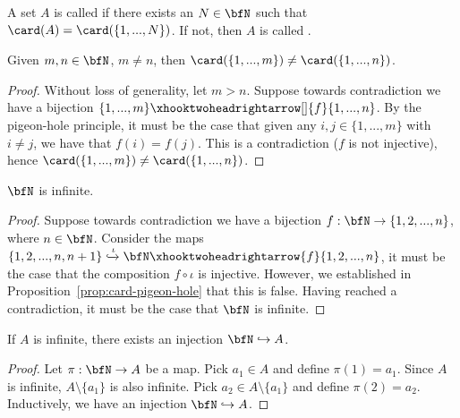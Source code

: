         \begin{definition}
            A set $A$ is called  if there exists an $N \in \bfN$ such that $\card(A) = \card(\{1,...,N\})$. If not, then $A$ is called .
        \end{definition}

        \begin{proposition}\label{prop:card-pigeon-hole}
            Given $m,n \in \bfN$, $m \neq n$, then $\card(\{1,...,m\}) \neq \card(\{1,...,n\})$.
        \end{proposition}
            \begin{proof}
                Without loss of generality, let $m > n$. Suppose towards contradiction we have a bijection $\{1,...,m\} \xhooktwoheadrightarrow[]{f} \{1,...,n\}$. By the pigeon-hole principle, it must be the case that \textemdash given any $i,j \in \{1,...,m\}$ with $i\neq j$, we have that $f(i) = f(j)$. This is a contradiction ($f$ is not injective), hence $\card(\{1,...,m\}) \neq \card(\{1,...,n\})$.
            \end{proof}

        \begin{proposition}
            $\bfN$ is infinite.
        \end{proposition}
            \begin{proof}
                Suppose towards contradiction we have a bijection $f:\bfN \rightarrow \{1,2,...,n\}$, where $n \in \bfN$. Consider the maps $\{1,2,...,n,n+1\} \xhookrightarrow{\iota} \bfN \xhooktwoheadrightarrow{f} \{1,2,...,n\}$, it must be the case that the composition $f \circ \iota$ is injective. However, we established in Proposition~\ref{prop:card-pigeon-hole} that this is false. Having reached a contradiction, it must be the case that $\bfN$ is infinite.
            \end{proof}

        \begin{exercise}\label{exercise:infinite-implies-injection}
            If $A$ is infinite, there exists an injection $\bfN \hookrightarrow A$.
        \end{exercise}
            \begin{proof}
                Let $\pi:\bfN \rightarrow A$ be a map. Pick $a_1 \in A$ and define $\pi(1) = a_1$. Since $A$ is infinite, $A \setminus \{a_1\}$ is also infinite. Pick $a_2 \in A \setminus \{a_1\}$ and define $\pi(2) = a_2$. Inductively, we have an injection $\bfN \hookrightarrow A$.
            \end{proof}

